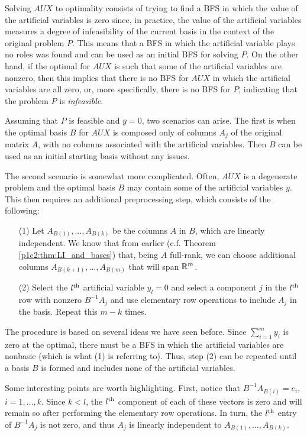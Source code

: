 Solving $AUX$ to optimality consists of trying to find a BFS in which the value of the artificial variables is zero since, in practice, the value of the artificial variables measures a degree of infeasibility of the current basis in the context of the original problem $P$. This means that a BFS in which the artificial variable plays no roles was found and can be used as an initial BFS for solving $P$. On the other hand, if the optimal for $AUX$ is such that some of the artificial variables are nonzero, then this implies that there is no BFS for $AUX$ in which the artificial variables are all zero, or, more specifically, there is no BFS for $P$, indicating that the problem $P$ is \emph{infeasible}.

Assuming that $P$ is feasible and $\overline{y}=0$, two scenarios can arise. The first is when the optimal basis $B$ for $AUX$ is composed only of columns $A_j$ of the original matrix $A$, with no columns associated with the artificial variables. Then $B$ can be used as an initial starting basis without any issues.

The second scenario is somewhat more complicated. Often, $AUX$ is a degenerate problem and the optimal basis $B$ may contain some of the artificial variables $y$. This then requires an additional preprocessing step, which consists of the following:
%
\begin{enumerate}
	\item[(1)] Let $A_{B(1)}, \dots, A_{B(k)}$ be the columns $A$ in $B$, which are linearly independent. We know that from earlier (c.f. Theorem \ref{p1c2:thm:LI_and_bases}) that, being $A$ full-rank, we can choose additional columns $A_{B(k+1)}, \dots, A_{B(m)}$ that will span $\mathbb{R}^{m}$.
	\item[(2)] Select the $l^\text{th}$ artificial variable $y_l = 0$ and select a component $j$ in the $l^\text{th}$ row with nonzero $B^{-1}A_j$ and use elementary row operations to include $A_j$ in the basis. Repeat this $m-k$ times.
\end{enumerate}

The procedure is based on several ideas we have seen before. Since $\sum_{i=1}^m y_i$ is zero at the optimal, there must be a BFS in which the artificial variables are nonbasic (which is what (1) is referring to). Thus, step (2) can be repeated until a basis $B$ is formed and includes none of the artificial variables. 

Some interesting points are worth highlighting. First, notice that $B^{-1}A_{B(i)} = e_i$, $i=1, \dots, k$. Since $k < l$, the $l^\text{th}$ component of each of these vectors is zero and will remain so after performing the elementary row operations. In turn, the $l^\text{th}$ entry of $B^{-1}A_j$ is not zero, and thus $A_j$ is linearly independent to $A_{B(1)}, \dots, A_{B(k)}$. 

